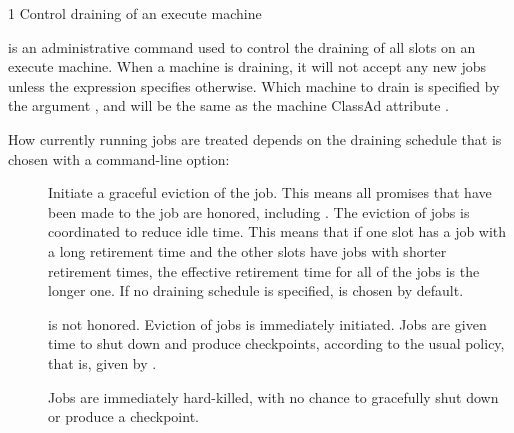 \begin{ManPage}
{\label{man-condor-drain}}{1}
{Control draining of an execute machine}

\Synopsis {}

\ToolDebugOption
{}

\ToolDebugOption
{}

\Description

 is an administrative command used to control the draining
of all slots on an execute machine.  
When a machine is draining, it will not accept any new jobs
unless the  expression specifies otherwise.
Which machine to drain is specified by the argument ,
and will be the same as the machine ClassAd attribute . 

How currently running jobs are treated 
depends on the draining schedule that is chosen with a command-line option:

\begin{description}

\item[] Initiate a graceful eviction of the job.  
This means all promises that have been made to the job are honored, 
including .  
The eviction of jobs is coordinated to reduce idle time.  
This means that if one slot has a job with a long
retirement time and the other slots have jobs with shorter retirement times, 
the effective retirement time for all of the jobs is the longer one.
If no draining schedule is specified, 
 is chosen by default.

\item[]  is not honored.  
Eviction of jobs is immediately initiated.  
Jobs are given time to shut down and produce checkpoints,
 according to the usual policy, that is, 
given by .

\item[] Jobs are immediately hard-killed,
with no chance to gracefully shut down or produce a checkpoint.


\end{description}
\end{ManPage}
